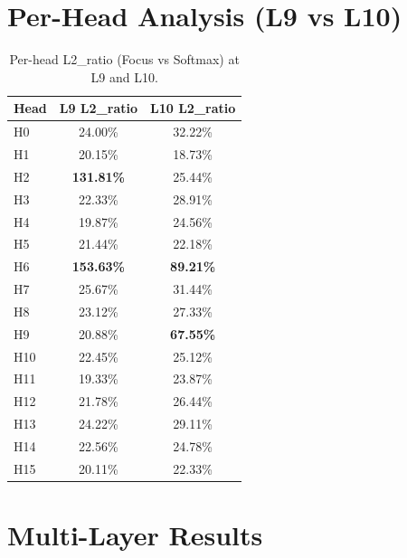 \documentclass[11pt]{article}
\begin{document}
\section{Per-Head Analysis (L9 vs L10)}

\begin{table}[h]
\centering
\begin{tabular}{lcc}
\toprule
Head & L9 L2\_ratio & L10 L2\_ratio \\
\midrule
H0 & 24.00\% & 32.22\% \\
H1 & 20.15\% & 18.73\% \\
H2 & \textbf{131.81\%} & 25.44\% \\
H3 & 22.33\% & 28.91\% \\
H4 & 19.87\% & 24.56\% \\
H5 & 21.44\% & 22.18\% \\
H6 & \textbf{153.63\%} & \textbf{89.21\%} \\
H7 & 25.67\% & 31.44\% \\
H8 & 23.12\% & 27.33\% \\
H9 & 20.88\% & \textbf{67.55\%} \\
H10 & 22.45\% & 25.12\% \\
H11 & 19.33\% & 23.87\% \\
H12 & 21.78\% & 26.44\% \\
H13 & 24.22\% & 29.11\% \\
H14 & 22.56\% & 24.78\% \\
H15 & 20.11\% & 22.33\% \\
\bottomrule
\end{tabular}
\caption{Per-head L2\_ratio (Focus vs Softmax) at L9 and L10.}
\end{table}

\section{Multi-Layer Results}
\end{document}
